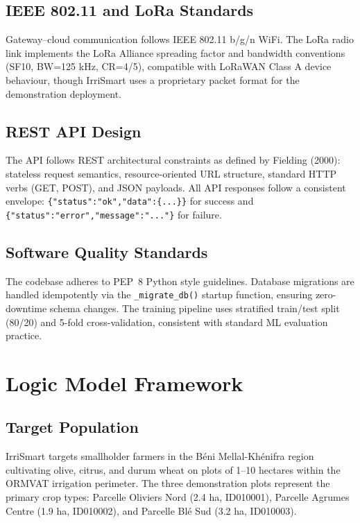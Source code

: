\documentclass[12pt,a4paper]{report}
\begin{document}
\section{IEEE 802.11 and LoRa Standards}
Gateway--cloud communication follows IEEE 802.11 b/g/n WiFi. The LoRa radio link implements the LoRa Alliance spreading factor and bandwidth conventions (SF10, BW=125 kHz, CR=4/5), compatible with LoRaWAN Class A device behaviour, though IrriSmart uses a proprietary packet format for the demonstration deployment.

\section{REST API Design}
The API follows REST architectural constraints as defined by Fielding (2000): stateless request semantics, resource-oriented URL structure, standard HTTP verbs (GET, POST), and JSON payloads. All API responses follow a consistent envelope: \texttt{\{"status":"ok","data":\{...\}\}} for success and \texttt{\{"status":"error","message":"..."\}} for failure.

\section{Software Quality Standards}
The codebase adheres to PEP~8 Python style guidelines. Database migrations are handled idempotently via the \texttt{\_migrate\_db()} startup function, ensuring zero-downtime schema changes. The training pipeline uses stratified train/test split (80/20) and 5-fold cross-validation, consistent with standard ML evaluation practice.

\chapter{Logic Model Framework}

\section{Target Population}
IrriSmart targets smallholder farmers in the Béni Mellal-Khénifra region cultivating olive, citrus, and durum wheat on plots of 1--10 hectares within the ORMVAT irrigation perimeter. The three demonstration plots represent the primary crop types: Parcelle Oliviers Nord (2.4 ha, ID010001), Parcelle Agrumes Centre (1.9 ha, ID010002), and Parcelle Blé Sud (3.2 ha, ID010003).
\end{document}
